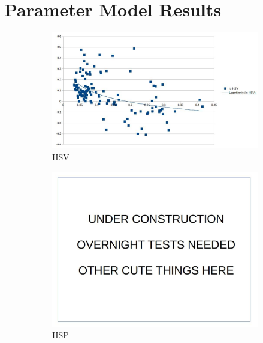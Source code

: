 \documentclass[12pt]{report}
\begin{document}
\section{Parameter Model Results}
\begin{figure}
\centering
\begin{subfigure}{.49\linewidth}
  \includegraphics[width=1\linewidth]{figures/model_hsv.jpg}
  \caption{HSV}
\end{subfigure}
\hfill
\begin{subfigure}{.49\linewidth}
  \includegraphics[width=1\linewidth]{figures/placeholder.jpg}
  \caption{HSP}
\end{subfigure}
\hfill
\begin{subfigure}{.49\linewidth}

\end{subfigure}
\end{figure}
\end{document}
